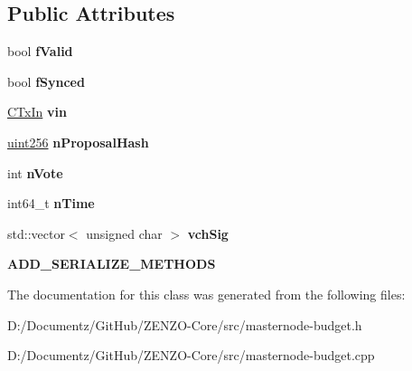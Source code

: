 \subsection*{Public Attributes}
\begin{DoxyCompactItemize}
\item 
\mbox{\label{class_c_budget_vote_a069471bf430ecee3065929591dc47aba}} 
bool {\bfseries f\+Valid}
\item 
\mbox{\label{class_c_budget_vote_ada87c71869d08d9869c5739f4a5b626e}} 
bool {\bfseries f\+Synced}
\item 
\mbox{\label{class_c_budget_vote_a335d3b479d57994097eccb52b50cbe53}} 
\mbox{\hyperlink{class_c_tx_in}{C\+Tx\+In}} {\bfseries vin}
\item 
\mbox{\label{class_c_budget_vote_a185648d07f641e8d663afcbf7a7c1a24}} 
\mbox{\hyperlink{classuint256}{uint256}} {\bfseries n\+Proposal\+Hash}
\item 
\mbox{\label{class_c_budget_vote_a6eafe2cf4bca2b25d5662b2601334a8d}} 
int {\bfseries n\+Vote}
\item 
\mbox{\label{class_c_budget_vote_a7cde3552eacf54d86796d3ff48601125}} 
int64\+\_\+t {\bfseries n\+Time}
\item 
\mbox{\label{class_c_budget_vote_abe31c3e9d62a7254550030f2b67643d7}} 
std\+::vector$<$ unsigned char $>$ {\bfseries vch\+Sig}
\item 
\mbox{\label{class_c_budget_vote_a9d6b5f88ab856880bd384a7733e3436f}} 
{\bfseries A\+D\+D\+\_\+\+S\+E\+R\+I\+A\+L\+I\+Z\+E\+\_\+\+M\+E\+T\+H\+O\+DS}
\end{DoxyCompactItemize}


The documentation for this class was generated from the following files\+:\begin{DoxyCompactItemize}
\item 
D\+:/\+Documentz/\+Git\+Hub/\+Z\+E\+N\+Z\+O-\/\+Core/src/masternode-\/budget.\+h\item 
D\+:/\+Documentz/\+Git\+Hub/\+Z\+E\+N\+Z\+O-\/\+Core/src/masternode-\/budget.\+cpp\end{DoxyCompactItemize}
